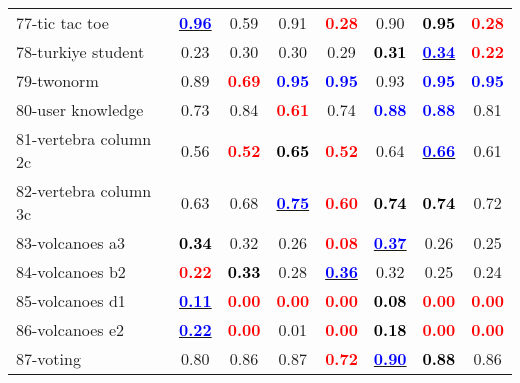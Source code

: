 \begin{table}[h]
\begin{center}
\begin{tabular}{lc|c|c|c|c|c|c}
77-tic tac toe & \underline{\textcolor{blue}{\textbf{  0.96}}} &   0.59 &   0.91 & \textcolor{red}{\textbf{  0.28}} &   0.90 & \textcolor{black}{\textbf{  0.95}} & \textcolor{red}{\textbf{  0.28}} \\
78-turkiye student &   0.23 &   0.30 &   0.30 &   0.29 & \textcolor{black}{\textbf{  0.31}} & \underline{\textcolor{blue}{\textbf{  0.34}}} & \textcolor{red}{\textbf{  0.22}} \\
79-twonorm &   0.89 & \textcolor{red}{\textbf{  0.69}} & \textcolor{blue}{\textbf{  0.95}} & \textcolor{blue}{\textbf{  0.95}} &   0.93 & \textcolor{blue}{\textbf{  0.95}} & \textcolor{blue}{\textbf{  0.95}} \\
80-user knowledge &   0.73 &   0.84 & \textcolor{red}{\textbf{  0.61}} &   0.74 & \textcolor{blue}{\textbf{  0.88}} & \textcolor{blue}{\textbf{  0.88}} &   0.81 \\
81-vertebra column 2c &   0.56 & \textcolor{red}{\textbf{  0.52}} & \textcolor{black}{\textbf{  0.65}} & \textcolor{red}{\textbf{  0.52}} &   0.64 & \underline{\textcolor{blue}{\textbf{  0.66}}} &   0.61 \\ \hline
82-vertebra column 3c &   0.63 &   0.68 & \underline{\textcolor{blue}{\textbf{  0.75}}} & \textcolor{red}{\textbf{  0.60}} & \textcolor{black}{\textbf{  0.74}} & \textcolor{black}{\textbf{  0.74}} &   0.72 \\
83-volcanoes a3 & \textcolor{black}{\textbf{  0.34}} &   0.32 &   0.26 & \textcolor{red}{\textbf{  0.08}} & \underline{\textcolor{blue}{\textbf{  0.37}}} &   0.26 &   0.25 \\
84-volcanoes b2 & \textcolor{red}{\textbf{  0.22}} & \textcolor{black}{\textbf{  0.33}} &   0.28 & \underline{\textcolor{blue}{\textbf{  0.36}}} &   0.32 &   0.25 &   0.24 \\
85-volcanoes d1 & \underline{\textcolor{blue}{\textbf{  0.11}}} & \textcolor{red}{\textbf{  0.00}} & \textcolor{red}{\textbf{  0.00}} & \textcolor{red}{\textbf{  0.00}} & \textcolor{black}{\textbf{  0.08}} & \textcolor{red}{\textbf{  0.00}} & \textcolor{red}{\textbf{  0.00}} \\
86-volcanoes e2 & \underline{\textcolor{blue}{\textbf{  0.22}}} & \textcolor{red}{\textbf{  0.00}} &   0.01 & \textcolor{red}{\textbf{  0.00}} & \textcolor{black}{\textbf{  0.18}} & \textcolor{red}{\textbf{  0.00}} & \textcolor{red}{\textbf{  0.00}} \\ \hline
87-voting &   0.80 &   0.86 &   0.87 & \textcolor{red}{\textbf{  0.72}} & \underline{\textcolor{blue}{\textbf{  0.90}}} & \textcolor{black}{\textbf{  0.88}} &   0.86 \\

\end{tabular}
\end{center}
\end{table}
